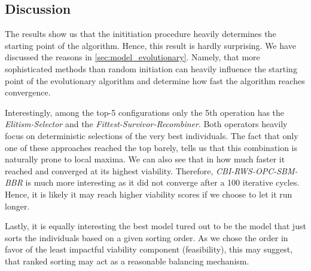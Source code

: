 \documentclass[./../../paper.tex]{subfiles}
\begin{document}
\subsection{Discussion}

The results show us that the inititiation procedure heavily determines the starting point of the algorithm. Hence, this result is hardly surprising. We have discussed the reasons in \autoref{sec:model_evolutionary}. Namely, that more sophisticated methods than random initiation can heavily influence the starting point of the evolutionary algorithm and determine how fast the algorithm reaches convergence. 

Interestingly, among the top-5 configurations only the 5th operation has the \emph{Elitism-Selector} and the \emph{Fittest-Survivor-Recombiner}. Both operators heavily focus on deterministic selections of the very best individuals. The fact that only one of these approaches reached the top barely, tells us that this combination is naturally prone to local maxima. We can also see that in how much faster it reached and converged at its highest viability. Therefore, \emph{CBI-RWS-OPC-SBM-BBR} is much more interesting as it did not converge after a 100 iterative cycles. Hence, it is likely it may reach higher viability scores if we choose to let it run longer.

Lastly, it is equally interesting the best model tured out to be the model that just sorts the individuals based on a given sorting order. As we chose the order in favor of the least impactful viability component (feasibility), this may suggest, that ranked sorting may act as a reasonable balancing mechanism. 

\end{document}
